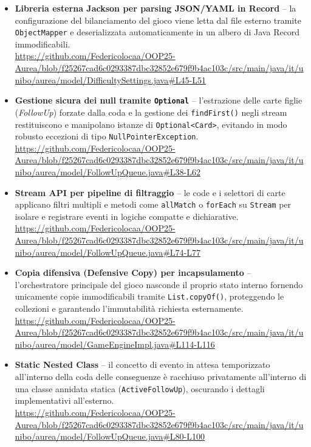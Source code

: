 \documentclass[11pt, a4paper, oneside]{report}
\begin{document}
\begin{itemize}
    \item \textbf{Libreria esterna Jackson per parsing JSON/YAML in Record} -- la configurazione del bilanciamento del gioco viene letta dal file esterno tramite \texttt{ObjectMapper} e deserializzata automaticamente in un albero di Java Record immodificabili. \\
    \url{https://github.com/Federicolocaa/OOP25-Aurea/blob/f25267cad6c0293387dbc32852e679f9b4ac103c/src/main/java/it/unibo/aurea/model/DifficultySettings.java#L45-L51}

    \item \textbf{Gestione sicura dei null tramite \texttt{Optional}} -- l'estrazione delle carte figlie (\emph{FollowUp}) forzate dalla coda e la gestione dei \texttt{findFirst()} negli stream restituiscono e manipolano istanze di \texttt{Optional<Card>}, evitando in modo robusto eccezioni di tipo \texttt{NullPointerException}. \\
    \url{https://github.com/Federicolocaa/OOP25-Aurea/blob/f25267cad6c0293387dbc32852e679f9b4ac103c/src/main/java/it/unibo/aurea/model/FollowUpQueue.java#L38-L62}

    \item \textbf{Stream API per pipeline di filtraggio} -- le code e i selettori di carte applicano filtri multipli e metodi come \texttt{allMatch} o \texttt{forEach} su \texttt{Stream} per isolare e registrare eventi in logiche compatte e dichiarative. \\
    \url{https://github.com/Federicolocaa/OOP25-Aurea/blob/f25267cad6c0293387dbc32852e679f9b4ac103c/src/main/java/it/unibo/aurea/model/FollowUpQueue.java#L74-L77}

    \item \textbf{Copia difensiva (Defensive Copy) per incapsulamento} -- l'orchestratore principale del gioco nasconde il proprio stato interno fornendo unicamente copie immodificabili tramite \texttt{List.copyOf()}, proteggendo le collezioni e garantendo l'immutabilità richiesta esternamente. \\
    \url{https://github.com/Federicolocaa/OOP25-Aurea/blob/f25267cad6c0293387dbc32852e679f9b4ac103c/src/main/java/it/unibo/aurea/model/GameEngineImpl.java#L114-L116}

    \item \textbf{Static Nested Class} -- il concetto di evento in attesa temporizzato all'interno della coda delle conseguenze è racchiuso privatamente all'interno di una classe annidata statica (\texttt{ActiveFollowUp}), oscurando i dettagli implementativi all'esterno. \\
    \url{https://github.com/Federicolocaa/OOP25-Aurea/blob/f25267cad6c0293387dbc32852e679f9b4ac103c/src/main/java/it/unibo/aurea/model/FollowUpQueue.java#L80-L100}
\end{itemize}
\end{document}
